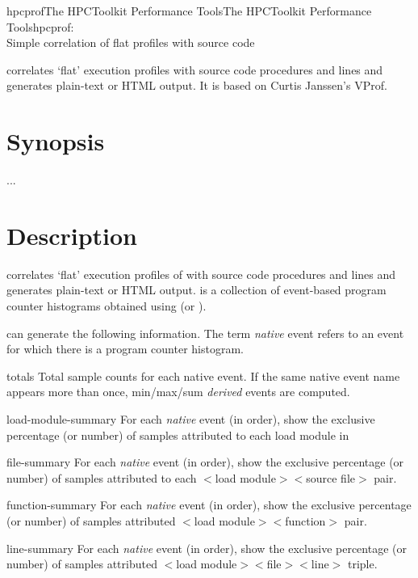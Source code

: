 \documentclass[english]{article}
\begin{document}
\begin{Name}{1}{hpcprof}{The HPCToolkit Performance Tools}{The HPCToolkit Performance Tools}{hpcprof:\\ Simple correlation of flat profiles with source code}

 correlates `flat' execution profiles with source code procedures and lines and generates plain-text or HTML output.
It is based on Curtis Janssen's VProf.

\end{Name}

\section{Synopsis}

   ...

\section{Description}

 correlates `flat' execution profiles of  with source code procedures and lines and generates plain-text or HTML output.
 is a collection of event-based program counter histograms obtained using  (or ).

 can generate the following information.  The term \emph{native} event refers to an event for which there is a program counter histogram.
\begin{Description}
  \item[totals] Total sample counts for each native event.  If the same native event name appears more than once, min/max/sum \emph{derived} events are computed.
  \item[load-module-summary] For each \emph{native} event (in order), show the exclusive percentage (or number) of samples attributed to each load module in 
  \item[file-summary] For each \emph{native} event (in order), show the exclusive percentage (or number) of samples attributed to each $<$load module$>$$<$source file$>$ pair.
  \item[function-summary] For each \emph{native} event (in order), show the exclusive percentage (or number) of samples attributed $<$load module$>$$<$function$>$ pair.
  \item[line-summary] For each \emph{native} event (in order), show the exclusive percentage (or number) of samples attributed $<$load module$>$$<$file$>$$<$line$>$ triple.
\end{Description}
\end{document}
